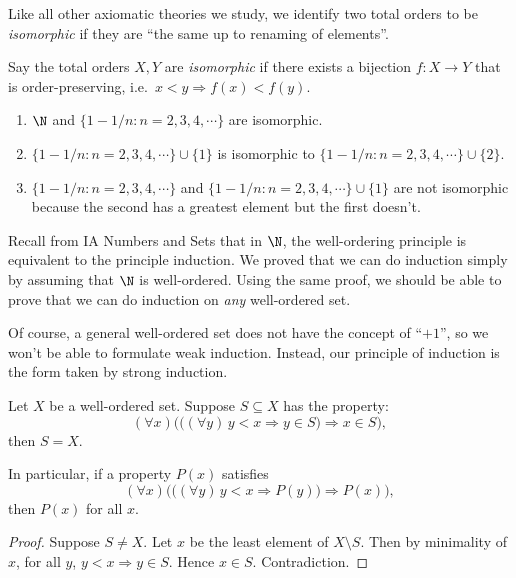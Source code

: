 \documentclass[a4paper]{article}
\begin{document}
Like all other axiomatic theories we study, we identify two total orders to be \emph{isomorphic} if they are ``the same up to renaming of elements''.
\begin{defi}
  Say the total orders $X, Y$ are \emph{isomorphic} if there exists a bijection $f: X\to Y$ that is order-preserving, i.e.\ $x < y \Rightarrow f(x) < f(y)$.
\end{defi}

\begin{eg}\leavevmode
\begin{enumerate}
  \item $\N$ and $\{1 - 1/n: n = 2, 3, 4, \cdots\}$ are isomorphic.
  \item $\{1 - 1/n:n = 2, 3, 4, \cdots\}\cup \{1\}$ is isomorphic to $\{1 - 1/n: n = 2, 3, 4, \cdots\} \cup \{2\}$.
  \item $\{1 - 1/n: n = 2, 3, 4, \cdots\}$ and $\{1 - 1/n: n = 2, 3, 4, \cdots\}\cup \{1\}$ are not isomorphic because the second has a greatest element but the first doesn't.
\end{enumerate}
\end{eg}

Recall from IA Numbers and Sets that in $\N$, the well-ordering principle is equivalent to the principle induction. We proved that we can do induction simply by assuming that $\N$ is well-ordered. Using the same proof, we should be able to prove that we can do induction on \emph{any} well-ordered set.

Of course, a general well-ordered set does not have the concept of ``$+1$'', so we won't be able to formulate weak induction. Instead, our principle of induction is the form taken by strong induction.
\begin{prop}
  Let $X$ be a well-ordered set. Suppose $S \subseteq X$ has the property:
  \[
    (\forall x)\Big(\big((\forall y)\, y < x \Rightarrow y\in S\big) \Rightarrow x\in S\Big),
  \]
  then $S = X$.

  In particular, if a property $P(x)$ satisfies
  \[
    (\forall x)\Big(\big((\forall y)\, y < x \Rightarrow P(y)\big)\Rightarrow P(x)\Big),
  \]
  then $P(x)$ for all $x$.
\end{prop}

\begin{proof}
  Suppose $S\not=X$. Let $x$ be the least element of $X\setminus S$. Then by minimality of $x$, for all $y$, $y < x \Rightarrow y\in S$. Hence $x\in S$. Contradiction.
\end{proof}
\end{document}
